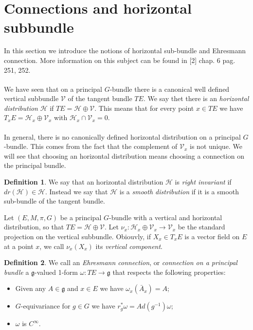 \documentclass[12pt,a4paper]{report}
\theoremstyle{definition}
\newtheorem{Def}{Definition}[chapter]
\theoremstyle{Theorem}
\theoremstyle{definition}
\theoremstyle{definition}
\begin{document}
		\section{Connections and horizontal subbundle}
		In this section we introduce the notions of horizontal sub-bundle and Ehresmann connection. More information on this subject can be found in [2] chap. 6 pag. 251, 252.\\
		\\
		We have seen that on a principal $G$-bundle there is a canonical well defined vertical subbundle $\mathcal{V}$ of the tangent bundle $TE$. We say thet there is an \textit{horizontal distribution} $\mathcal{H}$ if $TE=\mathcal{H}\oplus\mathcal{V}$. This means that for every point $x\in TE$ we have $T_{x}E=\mathcal{H}_{x}\oplus\mathcal{V}_{x}$ with $\mathcal{H}_{x}\cap\mathcal{V}_{x}=0$.
		\\
		\\
		In general, there is no canonically defined horizontal distribution on a principal $G$-bundle. This comes from the fact that the complement of $\mathcal{V}_x$ is not unique. We will see that choosing an horizontal distribution means choosing a connection on the principal bundle. 
		\begin{Def}
			We say that an horizontal distribution $\mathcal{H}$ is \textit{right invariant} if $dr(\mathcal{H})\in \mathcal{H}$.
			Instead we say that $\mathcal{H}$ is a \textit{smooth distribution} if it is a smooth sub-bundle of the tangent bundle.
		\end{Def}
		Let $(E,M,\pi,G)$ be a principal $G$-bundle with a vertical and horizontal distribution, so that $TE=\mathcal{H}\oplus\mathcal{V}$. Let $\nu_{x}:\mathcal{H}_{x}\oplus\mathcal{V}_{x}\rightarrow \mathcal{V}_{x}$ be the standard projection on the vertical subbundle. Obiouvly, if $X_{x}\in T_{x}E$ is a vector field on $E$ at a point $x$, we call $\nu_{x}(X_{x})$ its \textit{vertical component}.
		\begin{Def}\label{Def_6.6}
			We call an \textit{Ehresmann connection}, or \textit{connection on a principal bundle} a $\mathfrak{g}$-valued 1-form $\omega:TE\rightarrow \mathfrak{g}$ that respects the following properties:
			\begin{itemize}
				\item Given any $A\in\mathfrak{g}$ and $x\in E$ we have $\omega_{x}(\bar{A}_{x})=A$;
				\item $G$-equivariance for $g\in G$ we have $r^*_g\omega=Ad(g^{-1})\omega$;
				\item $\omega$ is $C^\infty$.
			\end{itemize}
		\end{Def}
\end{document}
